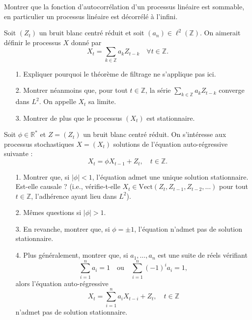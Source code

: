 \begin{exercise}
Montrer que la fonction d'autocorrélation d'un processus linéaire est sommable, en particulier un processus linéaire est décorrélé à l'infini.
\end{exercise}

\begin{exercise}
Soit $(Z_t)$ un bruit blanc centré réduit et soit $(a_n) \in \ell^2(\mathbb{Z})$. On aimerait définir le processus $X$ donné par
\[
X_t = \sum_{k \in \mathbb{Z}} a_k Z_{t-k} \quad \forall t \in \mathbb{Z}.
\]
\begin{enumerate}
    \item[1.] Expliquer pourquoi le théorème de filtrage ne s'applique pas ici.
    \item[2.] Montrer néanmoins que, pour tout $t \in \mathbb{Z}$, la série $\sum_{k \in \mathbb{Z}} a_k Z_{t-k}$ converge dans $L^2$. On appelle $X_t$ sa limite.
    \item[3.] Montrer de plus que le processus $(X_t)$ est stationnaire.
\end{enumerate}
\end{exercise}

\begin{exercise}
Soit $\phi \in \mathbb{R}^*$ et $Z = (Z_t)$ un bruit blanc centré réduit. On s'intéresse aux processus stochastiques $X = (X_t)$ solutions de l'équation auto-régressive suivante :
\[
X_t = \phi X_{t-1} + Z_t, \quad t \in \mathbb{Z}.
\]
\begin{enumerate}
    \item[1.] Montrer que, si $|\phi| < 1$, l'équation admet une unique solution stationnaire. Est-elle causale ? (i.e., vérifie-t-elle $X_t \in \text{Vect}(Z_t, Z_{t-1}, Z_{t-2}, \ldots)$ pour tout $t \in \mathbb{Z}$, l'adhérence ayant lieu dans $L^2$).
    \item[2.] Mêmes questions si $|\phi| > 1$.
    \item[3.] En revanche, montrer que, si $\phi = \pm 1$, l'équation n'admet pas de solution stationnaire.
    \item[4.] Plus généralement, montrer que, si $a_1, \ldots, a_n$ est une suite de réels vérifiant
    \[
    \sum_{i=1}^n a_i = 1 \quad \text{ou} \quad \sum_{i=1}^n (-1)^i a_i = 1,
    \]
    alors l'équation auto-régressive
    \[
    X_t = \sum_{i=1}^n a_i X_{t-i} + Z_t, \quad t \in \mathbb{Z}
    \]
    n'admet pas de solution stationnaire.
\end{enumerate}
\end{exercise}

